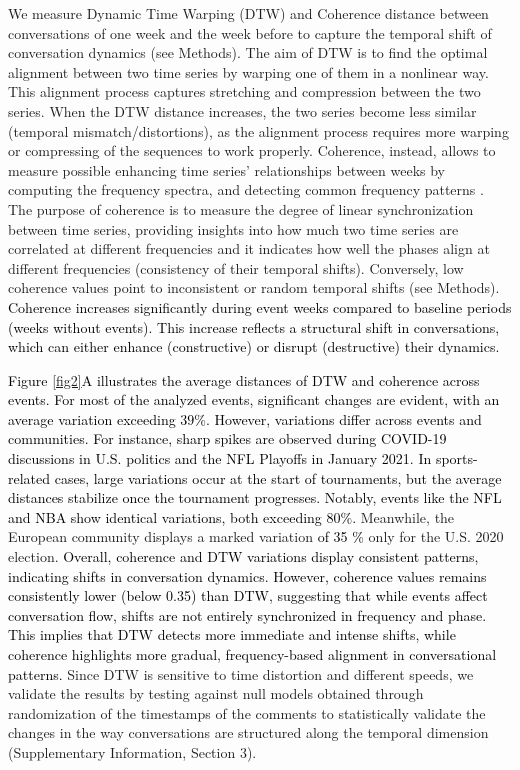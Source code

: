 \documentclass[fleqn,10pt]{wlscirep}
\newcommand{\new}[1]{\textcolor{black}{#1}}
\begin{document}
We measure Dynamic Time Warping (DTW) and Coherence distance between conversations of one week and the week before to capture the temporal shift of conversation dynamics (see Methods). 
The aim of DTW \cite{berndt1994using} is to find the optimal alignment between two time series by warping one of them in a nonlinear way. 
This alignment process captures stretching and compression between the two series. 
When the DTW distance increases, the two series become less similar (temporal mismatch/distortions), as the alignment process requires more warping or compressing of the sequences to work properly.
Coherence, instead, allows to measure possible enhancing time series' relationships between weeks by computing the frequency spectra, and detecting common frequency patterns \cite{grinsted2004application,maharaj2010coherence}. 
The purpose of coherence is to measure the degree of linear synchronization between time series, providing insights into how much two time series are correlated at different frequencies and it indicates how well the phases align at different frequencies (consistency of their temporal shifts).
Conversely, low coherence values point to inconsistent or random temporal shifts (see Methods).
\new{
Coherence increases significantly during event weeks compared to baseline periods (weeks without events). This increase reflects a structural shift in conversations, which can either enhance (constructive) or disrupt (destructive) their dynamics.
}

\new{
Figure \ref{fig2}A illustrates the average distances of DTW and coherence across events. For most of the analyzed events, significant changes are evident, with an average variation exceeding $39\%$. However, variations differ across events and communities. 
For instance, sharp spikes are observed during COVID-19 discussions in U.S. politics and the NFL Playoffs in January 2021.
In sports-related cases, large variations occur at the start of tournaments, but the average distances stabilize once the tournament progresses. 
Notably, events like the NFL and NBA show identical variations, both exceeding $80\%$. 
}
Meanwhile, the European community displays a marked variation \new{of 35 \%} only for the U.S. 2020 election.
\new{
Overall, coherence and DTW variations display consistent patterns, indicating shifts in conversation dynamics. 
However, coherence values remains consistently lower (below 0.35) than DTW, suggesting that while events affect conversation flow, shifts are not entirely synchronized in frequency and phase.
This implies that DTW detects more immediate and intense shifts, while coherence highlights more gradual, frequency-based alignment in conversational patterns.
}
Since DTW is sensitive to time distortion and different speeds, we validate the results by testing against null models obtained through randomization of the timestamps of the comments to statistically validate the changes in the way conversations are structured along the temporal dimension (Supplementary Information, Section 3).
\end{document}
